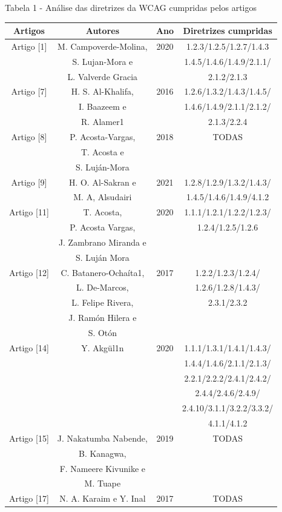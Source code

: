 \documentclass[a4paper]{article}
\begin{document}
\begin{titlepage}
Tabela 1 - Análise das diretrizes da WCAG cumpridas pelos artigos\\[-1cm]
\begin{center}
	\fontsize{8pt}{8pt}\selectfont
	\begin{longtable}{|c|c|c|c|}
		\hline
		Artigos & Autores & Ano & Diretrizes cumpridas\\
		\hline
		Artigo [1] & M. Campoverde-Molina,& 2020 & 1.2.3/1.2.5/1.2.7/1.4.3\\
				   & S. Lujan-Mora e & & 1.4.5/1.4.6/1.4.9/2.1.1/\\
				   & L. Valverde Gracia & & 2.1.2/2.1.3\\
		\hline
		Artigo [7] & H. S. Al-Khalifa, & 2016 & 1.2.6/1.3.2/1.4.3/1.4.5/\\
				   & I. Baazeem e & & 1.4.6/1.4.9/2.1.1/2.1.2/\\
				   & R. Alamer1 & & 2.1.3/2.2.4\\
		\hline
		Artigo [8] & P. Acosta-Vargas, & 2018 & TODAS\\
				   & T. Acosta e & & \\
				   & S. Luján-Mora & & \\
		\hline
		Artigo [9] & H. O. Al-Sakran e & 2021 & 1.2.8/1.2.9/1.3.2/1.4.3/\\
				   & M. A, Alsudairi & & 1.4.5/1.4.6/1.4.9/4.1.2\\
		\hline
		Artigo [11] & T. Acosta, & 2020 & 1.1.1/1.2.1/1.2.2/1.2.3/\\
					& P. Acosta Vargas, & & 1.2.4/1.2.5/1.2.6\\
					& J. Zambrano Miranda e & & \\
					& S. Luján Mora & & \\
		\hline
		Artigo [12] & C. Batanero-Ochaíta1, & 2017 & 1.2.2/1.2.3/1.2.4/\\
					& L. De-Marcos, & & 1.2.6/1.2.8/1.4.3/\\
					& L. Felipe Rivera, & & 2.3.1/2.3.2\\
					& J. Ramón Hilera e & & \\
					& S. Otón & & \\
		\hline
		Artigo [14] & Y. Akgül1n & 2020 & 1.1.1/1.3.1/1.4.1/1.4.3/\\
					& & & 1.4.4/1.4.6/2.1.1/2.1.3/\\
					& & & 2.2.1/2.2.2/2.4.1/2.4.2/\\
					& & & 2.4.4/2.4.6/2.4.9/\\
					& & & 2.4.10/3.1.1/3.2.2/3.3.2/\\
					& & & 4.1.1/4.1.2\\
		\hline
		Artigo [15] & J. Nakatumba Nabende, & 2019 & TODAS\\
					& B. Kanagwa, & &\\
					& F. Nameere Kivunike e & &\\
					& M. Tuape & &\\
		\hline
		Artigo [17] & N. A. Karaim e Y. Inal & 2017 & TODAS\\
		\hline
	\end{longtable}
\end{center}


\end{titlepage}
\end{document}
